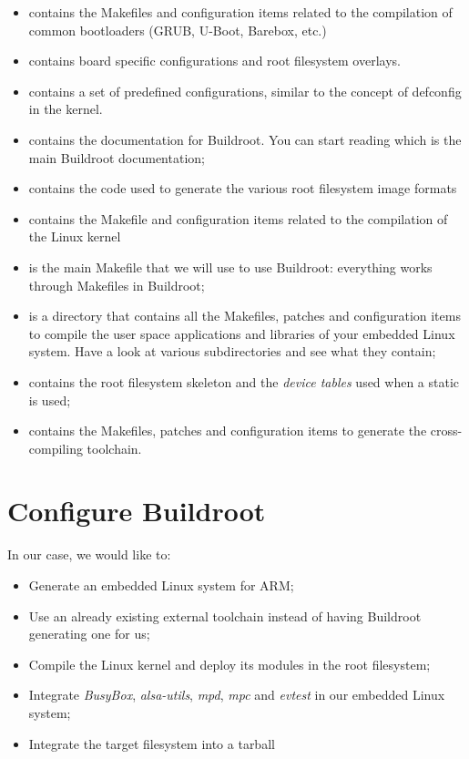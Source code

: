\begin{itemize}
\item {} contains the Makefiles and configuration items
  related to the compilation of common bootloaders (GRUB, U-Boot,
  Barebox, etc.)
\item {} contains board specific configurations and
  root filesystem overlays.
\item {} contains a set of predefined configurations,
  similar to the concept of defconfig in the kernel.
\item {} contains the documentation for Buildroot. You can
  start reading  which is the main Buildroot
  documentation;
\item {} contains the code used to generate the various root
  filesystem image formats
\item {} contains the Makefile and configuration items
  related to the compilation of the Linux kernel
\item {} is the main Makefile that we will use to use
  Buildroot: everything works through Makefiles in Buildroot;
\item {} is a directory that contains all the Makefiles,
  patches and configuration items to compile the user space
  applications and libraries of your embedded Linux system. Have a
  look at various subdirectories and see what they contain;
\item {} contains the root filesystem skeleton and the {\em
    device tables} used when a static  is used;
\item {} contains the Makefiles, patches and
  configuration items to generate the cross-compiling toolchain.
\end{itemize}


\section{Configure Buildroot}

In our case, we would like to:

\begin{itemize}
\item Generate an embedded Linux system for ARM;
\item Use an already existing external toolchain instead of having
  Buildroot generating one for us;
\item Compile the Linux kernel and deploy its modules in the root
  filesystem;
\item Integrate {\em BusyBox}, {\em alsa-utils},
  {\em mpd}, {\em mpc} and {\em evtest} in our embedded Linux system;
\item Integrate the target filesystem into a tarball
\end{itemize}


